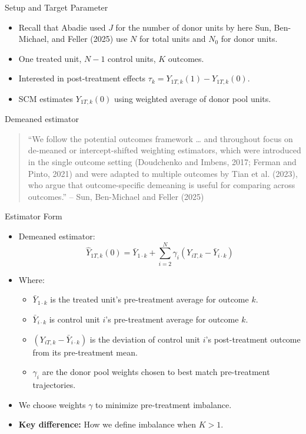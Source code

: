 \documentclass{beamer}
\begin{document}
\begin{frame}{Setup and Target Parameter}
  \begin{itemize}
  \item Recall that Abadie used $J$ for the number of donor units by here Sun, Ben-Michael, and Feller (2025) use $N$ for total units and $N_0$ for donor units.

    \item One treated unit, $N-1$ control units, $K$ outcomes.
    \item Interested in post-treatment effects $\tau_k = Y_{1T,k}(1) - Y_{1T,k}(0)$.
    \item SCM estimates $Y_{1T,k}(0)$ using weighted average of donor pool units.
  \end{itemize}
\end{frame}

\begin{frame}{Demeaned estimator}

\begin{quote}
“We follow the potential outcomes framework … and throughout focus on de-meaned or intercept-shifted weighting estimators, which were introduced in the single outcome setting (Doudchenko and Imbens, 2017; Ferman and Pinto, 2021) and were adapted to multiple outcomes by Tian et al. (2023), who argue that outcome-specific demeaning is useful for comparing across outcomes.” -- Sun, Ben-Michael and Feller (2025)
\end{quote}

\end{frame}

\begin{frame}{Estimator Form}
  \begin{itemize}
    \item Demeaned estimator:
    \[
    \hat{Y}_{1T,k}(0) = \bar{Y}_{1\cdot k} + \sum_{i=2}^N \gamma_i (Y_{iT,k} - \bar{Y}_{i\cdot k})
    \]
    \item Where:
    \begin{itemize}
      \item $\bar{Y}_{1\cdot k}$ is the treated unit’s pre-treatment average for outcome $k$.
      \item $\bar{Y}_{i\cdot k}$ is control unit $i$'s pre-treatment average for outcome $k$.
      \item $(Y_{iT,k} - \bar{Y}_{i\cdot k})$ is the deviation of control unit $i$'s post-treatment outcome from its pre-treatment mean.
      \item $\gamma_i$ are the donor pool weights chosen to best match pre-treatment trajectories.
    \end{itemize}
    \item We choose weights $\gamma$ to minimize pre-treatment imbalance.
    \item \textbf{Key difference:} How we define imbalance when $K > 1$.
  \end{itemize}
\end{frame}
\end{document}
